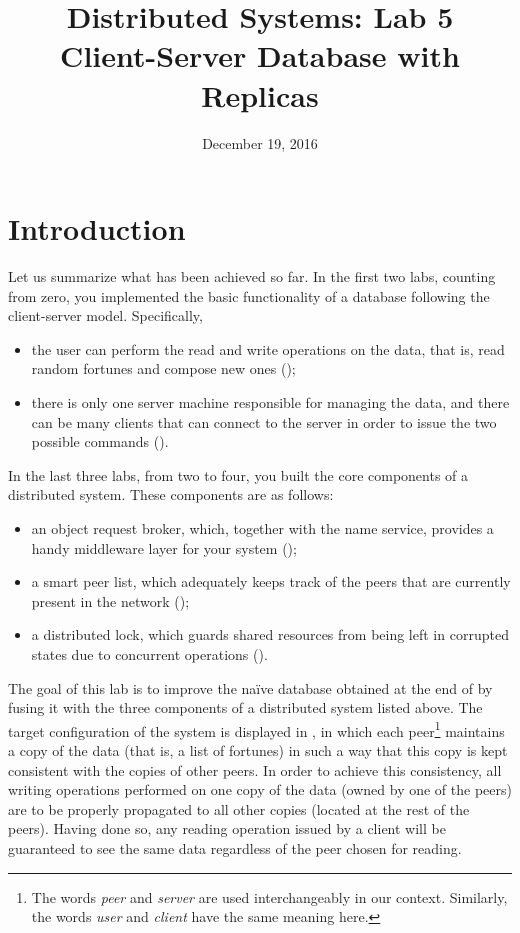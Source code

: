 \documentclass[a4paper]{article}
\title{Distributed Systems: Lab 5\\Client-Server Database with Replicas}
\author{}
\date{December 19, 2016}
\begin{document}
\maketitle

\section{Introduction}

Let us summarize what has been achieved so far. In the first two labs, counting
from zero, you implemented the basic functionality of a database following the
client-server model. Specifically,
\begin{itemize}

  \item the user can perform the read and write operations on the data, that is,
  read random fortunes and compose new ones ();

  \item there is only one server machine responsible for managing the data, and
  there can be many clients that can connect to the server in order to issue the
  two possible commands ().

\end{itemize}
In the last three labs, from two to four, you built the core components of a
distributed system. These components are as follows:
\begin{itemize}

  \item an object request broker, which, together with the name service,
  provides a handy middleware layer for your system ();

  \item a smart peer list, which adequately keeps track of the peers that are
  currently present in the network ();

  \item a distributed lock, which guards shared resources from being left in
  corrupted states due to concurrent operations ().

\end{itemize}
The goal of this lab is to improve the na\"{i}ve database obtained at the end of
 by fusing it with the three components of a distributed system listed
above. The target configuration of the system is displayed in
, in which each peer\footnote{The words \emph{peer}
and \emph{server} are used interchangeably in our context. Similarly, the words
\emph{user} and \emph{client} have the same meaning here.} maintains a copy of
the data (that is, a list of fortunes) in such a way that this copy is kept
consistent with the copies of other peers. In order to achieve this consistency,
all writing operations performed on one copy of the data (owned by one of the
peers) are to be properly propagated to all other copies (located at the rest of
the peers). Having done so, any reading operation issued by a client will be
guaranteed to see the same data regardless of the peer chosen for reading.
\end{document}
